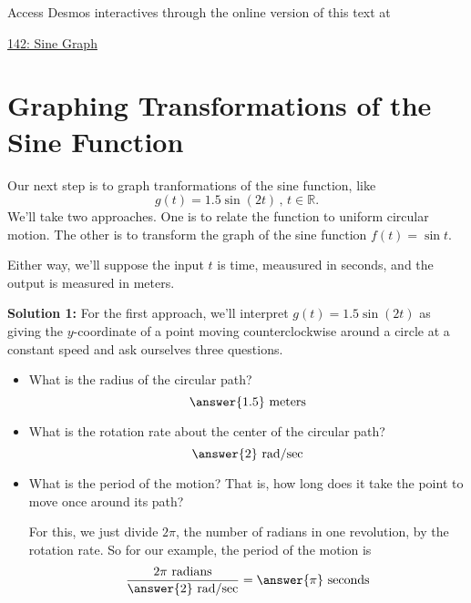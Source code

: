 \documentclass{ximera}
\begin{document}
\begin{exploration}
Access Desmos interactives through the online version of this text at
 
\href{https://www.desmos.com/calculator/lurdcthxqu}{142: Sine Graph}

 
\begin{onlineOnly}
    \begin{center}
\end{center}
\end{onlineOnly}
\end{exploration}


\section{Graphing Transformations of the Sine Function}
\begin{example} \label{Ed7ugg}

Our next step is to graph tranformations of the sine function, like
\[
    g(t) = 1.5\sin (2t) \, , \, t\in \mathbb{R} .
\]
We'll take two approaches. One is to relate the function to uniform circular motion. The other is to transform the graph of the sine function $f(t) = \sin t$. 

Either way, we'll suppose the input $t$ is time, meausured in seconds, and the output is measured in meters. 


{\bf Solution 1:} For the first approach, we'll interpret $g(t) = 1.5 \sin (2t)$ as giving the $y$-coordinate of a point moving counterclockwise around a circle at a constant speed and ask ourselves three questions.

\begin{itemize}
\item{
\begin{question} \label{Qdst656}
What is the radius of the circular path?  
\[
\answer{1.5} \text{ meters}
\]
\end{question}
}

\item{
\begin{question}  \label{Qdfsatt56}
What is the rotation rate about the center of the circular path?
\[
 \answer{2} \text{ rad/sec}
\]
\end{question}
}

\item{
\begin{question}  \label{Qdfsdsg56}
What is the period of the motion? That is, how long does it take the point to move once around its path?

For this, we just divide $2\pi$, the number of radians in one revolution, by the rotation rate. So for our example, the period of the motion is
\[
    \frac{2\pi \text{ radians}}{\answer{2}\text{ rad/sec}}   = \answer{\pi} \text{ seconds}
\]
\end{question}
}
\end{itemize}


\end{example}
\end{document}
